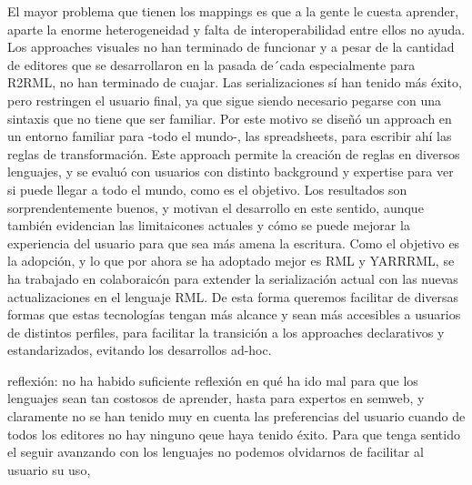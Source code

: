 



El mayor problema que tienen los mappings es que a la gente le cuesta aprender, aparte la enorme heterogeneidad y falta de interoperabilidad entre ellos no ayuda. Los approaches visuales no han terminado de funcionar y a pesar de la cantidad de editores que se desarrollaron en la pasada de´cada especialmente para R2RML, no han terminado de cuajar. Las serializaciones sí han tenido más éxito, pero restringen el usuario final, ya que sigue siendo necesario pegarse con una sintaxis que no tiene que ser familiar. Por este motivo se diseñó un approach en un entorno familiar para -todo el mundo-, las spreadsheets, para escribir ahí las reglas de transformación. Este approach permite la creación de reglas en diversos lenguajes, y se evaluó con usuarios con distinto background y expertise para ver si puede llegar a todo el mundo, como es el objetivo. Los resultados son sorprendentemente buenos, y motivan el desarrollo en este sentido, aunque también evidencian las limitaicones actuales y cómo se puede mejorar la experiencia del usuario para que sea más amena la escritura. Como el objetivo es la adopción, y lo que por ahora se ha adoptado mejor es RML y YARRRML, se ha trabajado en colaboraicón para extender la serialización actual con las nuevas actualizaciones en el lenguaje RML. De esta forma queremos facilitar de diversas formas que estas tecnologías tengan más alcance y sean más accesibles a usuarios de distintos perfiles, para facilitar la transición a los approaches declarativos y estandarizados, evitando los desarrollos ad-hoc.

reflexión: no ha habido suficiente reflexión en qué ha ido mal para que los lenguajes sean tan costosos de aprender, hasta para expertos en semweb, y claramente no se han tenido muy en cuenta las preferencias del usuario cuando de todos los editores no hay ninguno qeue haya tenido éxito. Para que tenga sentido el seguir avanzando con los lenguajes no podemos olvidarnos de facilitar al usuario su uso, 




